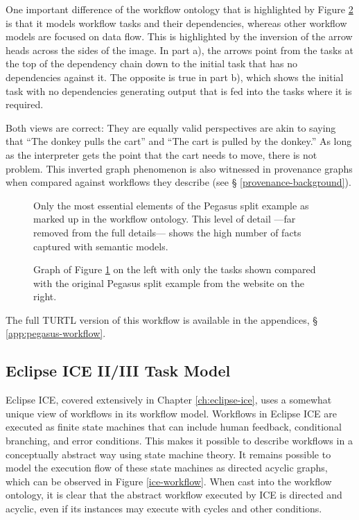 One important difference of the workflow ontology that is highlighted by
Figure \ref{pegasus-comparison} is that it models workflow tasks and their
dependencies, whereas other workflow models are focused on data flow. This is
highlighted by the inversion of the arrow heads across the sides of the image.
In part a), the arrows point from the tasks at the top of the dependency chain
down to the initial task that has no dependencies against it. The opposite is
true in part b), which shows the initial task with no dependencies generating
output that is fed into the tasks where it is required. 

Both views are correct: They are equally valid perspectives are akin
to saying that ``The donkey pulls the cart'' and ``The cart is pulled by the
donkey.'' As long as the interpreter gets the point that the cart needs to move,
there is not problem. This inverted graph phenomenon is also witnessed in
provenance graphs when compared against workflows they describe (see \S
\ref{provenance-background}).

\begin{figure}[htbp]
\centering
{}
\caption{Only the most essential elements of the Pegasus split
example as marked up in the workflow ontology. This level of detail ---far
removed from the full details--- shows the high number of facts captured with
semantic models.}
\label{pegasus-split-workflow}
\end{figure}

\begin{figure}[htbp]
\centering
{}
\caption{Graph of Figure \ref{pegasus-split-workflow} on the left with only
the tasks shown compared with the original Pegasus split example from the
website on the right.}
\label{pegasus-comparison}
\end{figure}

The full TURTL version of this workflow is available in the appendices, \S
\ref{app:pegasus-workflow}.

\subsection{Eclipse ICE II/III Task Model}

Eclipse ICE, covered extensively in Chapter \ref{ch:eclipse-ice},
uses a somewhat unique view of workflows in its workflow model. Workflows
in Eclipse ICE are executed as finite state machines that can include human
feedback, conditional branching, and error conditions. This makes it possible
to describe workflows in a conceptually abstract way using state machine
theory. It remains possible to model the execution flow of these state machines
as directed acyclic graphs, which can be observed in Figure \ref{ice-workflow}.
When cast into the workflow ontology, it is clear that the abstract workflow
executed by ICE is directed and acyclic, even if its instances may execute with
cycles and other conditions.

